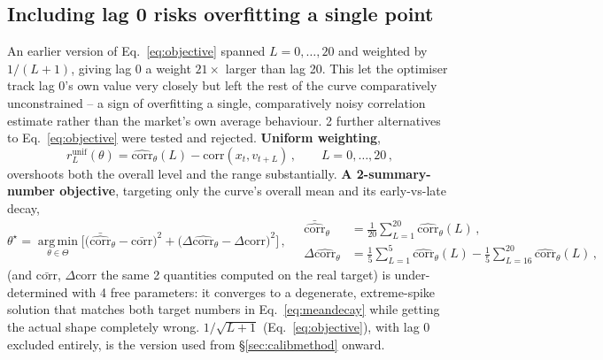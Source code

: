 \documentclass[11pt]{article}
\begin{document}
\subsection{Including lag 0 risks overfitting a single point}
\label{sec:lag0}
An earlier version of Eq.~\ref{eq:objective} spanned $L=0,\dots,20$ and
weighted by $1/(L+1)$, giving lag 0 a weight $21\times$ larger than lag 20.
This let the optimiser track lag 0's own value very closely but left the
rest of the curve comparatively unconstrained -- a sign of overfitting a
single, comparatively noisy correlation estimate rather than the market's
own average behaviour. 2 further alternatives to Eq.~\ref{eq:objective} were
tested and rejected. \textbf{Uniform weighting},
\begin{equation}
r_L^{\text{unif}}(\theta) = \widehat{\text{corr}}_\theta(L) -
\text{corr}(x_t,v_{t+L})\, ,\qquad L=0,\dots,20\, ,
\label{eq:uniform}
\end{equation}
overshoots both the overall level and the range substantially. \textbf{A
2-summary-number objective}, targeting only the curve's overall mean and its
early-vs-late decay,
\begin{equation}
\theta^\star = \operatorname*{arg\,min}_{\theta\in\Theta}
\Big[\big(\bar{\widehat{\text{corr}}}_\theta - \bar{\text{corr}}\big)^2 +
\big(\Delta\widehat{\text{corr}}_\theta - \Delta\text{corr}\big)^2\Big]\, ,
\quad
\begin{aligned}
\bar{\widehat{\text{corr}}}_\theta &= \tfrac{1}{20}\textstyle\sum_{L=1}^{20}
\widehat{\text{corr}}_\theta(L)\, ,\\
\Delta\widehat{\text{corr}}_\theta &= \tfrac{1}{5}\textstyle\sum_{L=1}^{5}
\widehat{\text{corr}}_\theta(L) - \tfrac{1}{5}\textstyle\sum_{L=16}^{20}
\widehat{\text{corr}}_\theta(L)\, ,
\end{aligned}
\label{eq:meandecay}
\end{equation}
(and $\bar{\text{corr}}$, $\Delta\text{corr}$ the same 2 quantities computed
on the real target) is under-determined with 4 free parameters: it converges
to a degenerate, extreme-spike solution that matches both target numbers in
Eq.~\ref{eq:meandecay} while getting the actual shape completely wrong.
$1/\sqrt{L+1}$ (Eq.~\ref{eq:objective}), with lag 0 excluded entirely, is the
version used from \S\ref{sec:calibmethod} onward.
\end{document}
